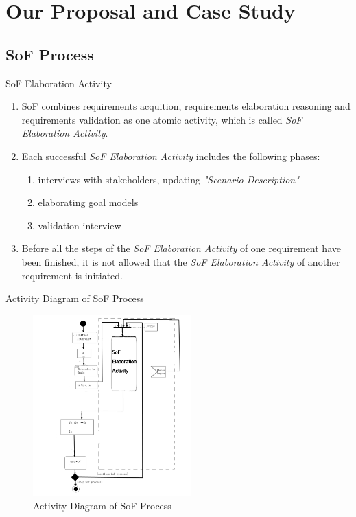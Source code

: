 \documentclass{beamer}
\begin{document}
\section{Our Proposal and Case Study}
\subsection{SoF Process}

\begin{frame}{SoF Elaboration Activity}
  \begin{enumerate}
  \item
    SoF combines requirements acquition, requirements elaboration reasoning and requirements validation as one atomic activity, which is called \emph{SoF Elaboration Activity}.\pause
  \item
    Each successful \emph{SoF Elaboration Activity} includes the following phases: \pause
    \begin{enumerate}
    \item interviews with stakeholders, updating \emph{"Scenario Description"}\pause
    \item elaborating goal models \pause%
    \item validation interview\pause
    \end{enumerate}
  \item
    Before all the steps of the \emph{SoF Elaboration Activity} of one requirement have been finished, it is not allowed that the \emph{SoF Elaboration Activity} of another requirement is initiated. 
  \end{enumerate}
\end{frame}

\begin{frame}{Activity Diagram of SoF Process}
  \begin{figure}
    \includegraphics[width=2.4in]{img/2_0.PNG}
    \caption{Activity Diagram of SoF Process}
  \end{figure}
\end{frame}  
\end{document}
